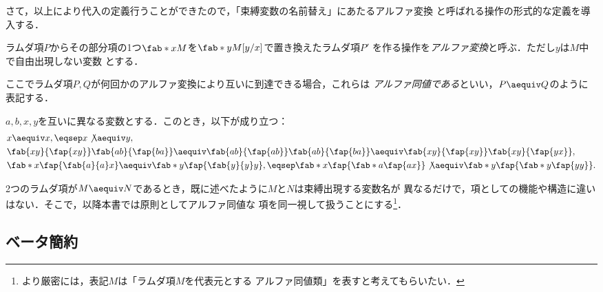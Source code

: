 \documentclass[uplatex,dvipdfmx,report,fleqn]{jsbook}
\begin{document}
さて，以上により代入の定義行うことができたので，「束縛変数の名前替え」にあたるアルファ変換
と呼ばれる操作の形式的な定義を導入する．
%
\begin{definition}[アルファ変換]
ラムダ項$P$からその部分項の1つ$\fab*{x}{M}$を$\fab*{y}{M[y/x]}$で置き換えたラムダ項$P'$
を作る操作を\emph{アルファ変換}と呼ぶ．ただし$y$は$M$中で自由出現しない変数
とする．
\end{definition}

ここでラムダ項$P,Q$が何回かのアルファ変換により互いに到達できる場合，これらは
\emph{アルファ同値である}といい，$P\aequiv Q$のように
表記する．
%
\begin{example}
$a,b,x,y$を互いに異なる変数とする．このとき，以下が成り立つ：
%
\begin{align*}
&x\aequiv x,\eqsep x\not\aequiv y,\\
&\fab{xy}{\fap{xy}}\fab{ab}{\fap{ba}}
\aequiv\fab{ab}{\fap{ab}}\fab{ab}{\fap{ba}}
\aequiv\fab{xy}{\fap{xy}}\fab{xy}{\fap{yx}},\\
&\fab*{x}{\fap{\fab{a}{a}x}}\aequiv\fab*{y}{\fap{\fab{y}{y}y}},\eqsep
\fab*{x}{\fap{\fab*{a}{\fap{ax}}}}\not\aequiv\fab*{y}{\fap{\fab*{y}{\fap{yy}}}}.
\end{align*}
\end{example}

2つのラムダ項が$M\aequiv N$であるとき，既に述べたように$M$と$N$は束縛出現する変数名が
異なるだけで，項としての機能や構造に違いはない．そこで，以降本書では原則としてアルファ同値な
項を同一視して扱うことにする\footnote{より厳密には，表記$M$は「ラムダ項$M$を代表元とする
アルファ同値類」を表すと考えてもらいたい．}．

\subsection{ベータ簡約}
\end{document}
